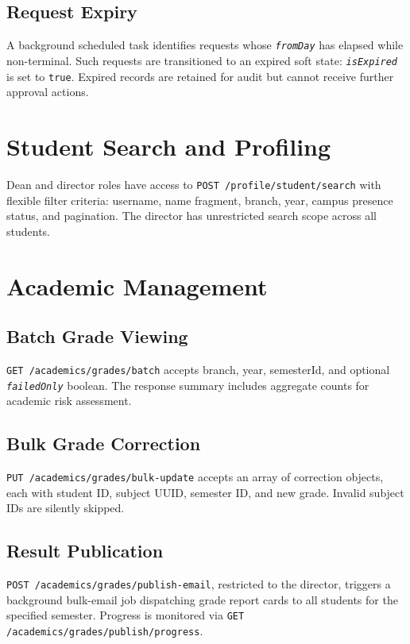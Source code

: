 \documentclass[12pt,a4paper]{report}
\newcommand{\api}[1]{\texttt{\small #1}}
\newcommand{\field}[1]{\texttt{\textit{#1}}}
\newcommand{\code}[1]{\texttt{#1}}
\begin{document}
\subsection{Request Expiry}

A background scheduled task identifies requests whose \field{fromDay} has elapsed while non-terminal. Such requests are transitioned to an expired soft state: \field{isExpired} is set to \code{true}. Expired records are retained for audit but cannot receive further approval actions.

\section{Student Search and Profiling}

Dean and director roles have access to \api{POST /profile/student/search} with flexible filter criteria: username, name fragment, branch, year, campus presence status, and pagination. The director has unrestricted search scope across all students.

\section{Academic Management}

\subsection{Batch Grade Viewing}

\api{GET /academics/grades/batch} accepts branch, year, semesterId, and optional \field{failedOnly} boolean. The response summary includes aggregate counts for academic risk assessment.

\subsection{Bulk Grade Correction}

\api{PUT /academics/grades/bulk-update} accepts an array of correction objects, each with student ID, subject UUID, semester ID, and new grade. Invalid subject IDs are silently skipped.

\subsection{Result Publication}

\api{POST /academics/grades/publish-email}, restricted to the director, triggers a background bulk-email job dispatching grade report cards to all students for the specified semester. Progress is monitored via \api{GET /academics/grades/publish/progress}.
\end{document}
